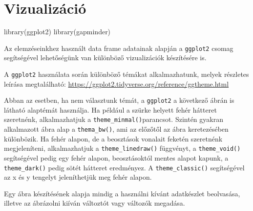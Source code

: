 \documentclass[
]{book}
\newenvironment{Shaded}{\begin{snugshade}}{\end{snugshade}}
\newcommand{\CommentTok}[1]{\textcolor[rgb]{0.56,0.35,0.01}{\textit{#1}}}
\newcommand{\DecValTok}[1]{\textcolor[rgb]{0.00,0.00,0.81}{#1}}
\newcommand{\FunctionTok}[1]{\textcolor[rgb]{0.00,0.00,0.00}{#1}}
\newcommand{\NormalTok}[1]{#1}
\newcommand{\SpecialCharTok}[1]{\textcolor[rgb]{0.00,0.00,0.00}{#1}}
\begin{document}
\begin{Shaded}
\end{Shaded}

\hypertarget{vizualizuxe1ciuxf3}{%
\section{Vizualizáció}\label{vizualizuxe1ciuxf3}}

\begin{Shaded}
\begin{Highlighting}[]
\FunctionTok{library}\NormalTok{(ggplot2)}
\FunctionTok{library}\NormalTok{(gapminder)}
\end{Highlighting}
\end{Shaded}

Az elemzéseinkhez használt data frame adatainak alapján a
\texttt{ggplot2} csomag segítségével lehetőségünk van különböző
vizualizációk készítésére is.

A \texttt{ggplot2} használata során különböző témákat alkalmazhatunk,
melyek részletes leírása megtalálható:
\url{https://ggplot2.tidyverse.org/reference/ggtheme.html}

Abban az esetben, ha nem választunk témát, a \texttt{ggplot2} a
következő ábrán is látható alaptémát használja. Ha például a szürke
helyett fehér hátteret szeretnénk, alkalmazhatjuk a
\texttt{theme\_minmal()}parancsot. Szintén gyakran alkalmazott ábra alap
a \texttt{thema\_bw()}, ami az előzőtől az ábra keretezésében
különbözik. Ha fehér alapon, de a beosztások vonalait feketén szeretnénk
megjeleníteni, alkalmazhatjuk a \texttt{theme\_linedraw()} függvényt, a
\texttt{theme\_void()} segítségével pedig egy fehér alapon,
beosztásoktól mentes alapot kapunk, a \texttt{theme\_dark()} pedig sötét
hátteret eredményez. A \texttt{theme\_classic()} segítségével az x és y
tengelyt jeleníthetjük meg fehér alapon.

Egy ábra készítésének alapja mindig a használni kívánt adatkészlet
beolvasása, illetve az ábrázolni kiíván változtót vagy változók
megadása.
\end{document}
